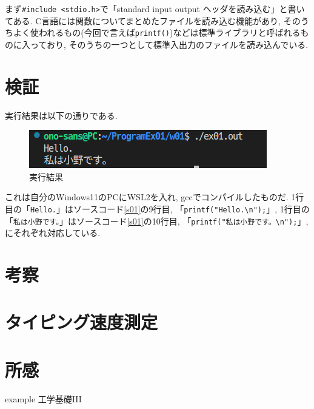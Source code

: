 \documentclass[a4paper, xelatex, ja=standard, 10.5pt]{bxjsarticle}
\begin{document}
まず\texttt{\#include <stdio.h>}で「standard input output ヘッダを読み込む」と書いてある.
C言語には関数についてまとめたファイルを読み込む機能があり,
そのうちよく使われるもの(今回で言えば\texttt{printf()})などは標準ライブラリと呼ばれるものに入っており,
そのうちの一つとして標準入出力のファイルを読み込んでいる.

\section{検証}
実行結果は以下の通りである.
\begin{figure}[H]
\centering
\includegraphics[scale=1.0]{img/wsl_result.png}
\caption{実行結果}
\label{}
\end{figure}
これは自分のWindows11のPCにWSL2を入れ, gccでコンパイルしたものだ.
1行目の「\texttt{Hello.}」はソースコード\ref{s01}の9行目,
「\texttt{printf("Hello.\textbackslash n");}」,
1行目の「\texttt{私は小野です。}」はソースコード\ref{s01}の10行目,
「\texttt{printf("私は小野です。\textbackslash n");}」,
にそれぞれ対応している.

\section{考察}
\section{タイピング速度測定}
\section{所感}

\begin{thebibliography}{9} %
  example 工学基礎I\hspace{-1.2pt}I\hspace{-1.2pt}I
\end{thebibliography}
\end{document}
